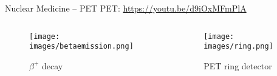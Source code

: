 \begin{frame}[c]{Nuclear Medicine -- PET}
PET: \href{https://youtu.be/d9iOxMFmPlA}{https://youtu.be/d9iOxMFmPlA}
	\begin{columns}[b, onlytextwidth]
		\begin{column}{0.5\textwidth}
			\begin{figure}
				\centering
				\texttt{[image: images/betaemission.png]}
				\caption{$\beta^+$ decay}
			\end{figure}
		\end{column}\begin{column}{0.5\textwidth}
			\centering{}
			\begin{figure}[]
				\centering
				\texttt{[image: images/ring.png]}
				\caption{PET ring detector}
			\end{figure}
		\end{column}
	\end{columns}
\end{frame}

